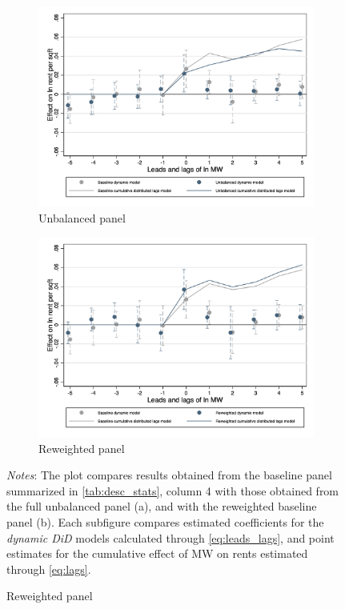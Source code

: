 \begin{figure}[htb!]
    \caption{Comparison between dynamic DiD models}
    \label{fig:dynamic_dd_comparison}
    \centering
    \begin{subfigure}[b]{0.8\textwidth}
        \caption{Unbalanced panel}
        \includegraphics[width = \textwidth]
        {../analysis/first_differences_unbal/output/fd_model_comparison_unbal.png}
    \end{subfigure}
    \begin{subfigure}[b]{0.8\textwidth}
        \caption{Reweighted panel}
        \includegraphics[width = \textwidth]
        {../analysis/first_differences_wgt/output/fd_model_comparison_wgt.png}
    \end{subfigure}
    \begin{minipage}{0.95\textwidth} \footnotesize
		\vspace{2mm} 
		\textit{Notes}: The plot compares results obtained from the baseline panel summarized in 
		\autoref{tab:desc_stats}, column 4 with those obtained from the full unbalanced panel (a), 
		and with the reweighted baseline panel (b). Each subfigure compares estimated coefficients 
		for the \textit{dynamic DiD} models calculated through \autoref{eq:leads_lags}, and point 
		estimates for the cumulative effect of MW on rents estimated through \autoref{eq:lags}.   
	\end{minipage}
\end{figure}


